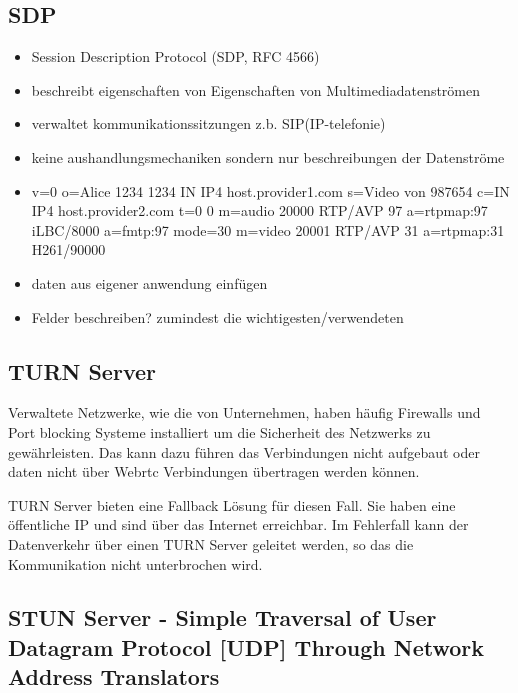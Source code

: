 

\subsection{SDP}

\begin{itemize}
	\item Session Description Protocol (SDP, RFC 4566) 
	\item beschreibt eigenschaften von Eigenschaften von Multimediadatenströmen
	\item verwaltet kommunikationssitzungen z.b. SIP(IP-telefonie)
	\item keine aushandlungsmechaniken sondern nur beschreibungen der Datenströme
	\item v=0
o=Alice 1234 1234 IN IP4 host.provider1.com
s=Video von 987654
c=IN IP4 host.provider2.com
t=0 0
m=audio 20000 RTP/AVP 97
a=rtpmap:97 iLBC/8000
a=fmtp:97 mode=30
m=video 20001 RTP/AVP 31
a=rtpmap:31 H261/90000
	\item daten aus eigener anwendung einfügen
	\item Felder beschreiben? zumindest die wichtigesten/verwendeten
\end{itemize}
\subsection{TURN Server}

Verwaltete Netzwerke, wie die von Unternehmen, haben häufig Firewalls und Port blocking Systeme installiert um die Sicherheit des Netzwerks zu gewährleisten. Das kann dazu führen das \webrtc Verbindungen nicht aufgebaut oder daten nicht über Webrtc Verbindungen übertragen werden können.

TURN Server bieten eine Fallback Lösung für diesen Fall. Sie haben eine öffentliche IP und sind über das Internet erreichbar. Im Fehlerfall kann der Datenverkehr über einen TURN Server geleitet werden, so das die Kommunikation nicht unterbrochen wird.

\subsection{STUN Server - Simple Traversal of User Datagram Protocol [UDP] Through Network Address Translators}

